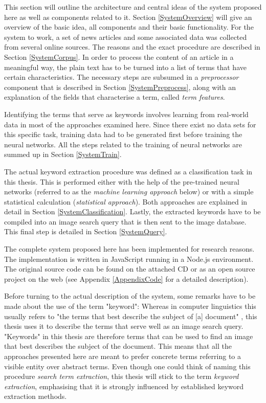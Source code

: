 \documentclass[11pt,a4paper,twoside]{article}
\begin{document}
This section will outline the architecture and central ideas of the system proposed here as well as components related to it. Section \ref{SystemOverview} will give an overview of the basic idea, all components and their basic functionality. For the system to work, a set of news articles and some associated data was collected from several online sources. The reasons and the exact procedure are described in Section \ref{SystemCorpus}. In order to process the content of an article in a meaningful way, the plain text has to be turned into a list of terms that have certain characteristics. The necessary steps are subsumed in a \emph{preprocessor} component that is described in Section \ref{SystemPreprocess}, along with an explanation of the fields that characterise a term, called \emph{term features}.

Identifying the terms that serve as keywords involves learning from real-world data in most of the approaches examined here. Since there exist no data sets for this specific task, training data had to be generated first before training the neural networks. All the steps related to the training of neural networks are summed up in Section \ref{SystemTrain}.

The actual keyword extraction procedure was defined as a classification task in this thesis. This is performed either with the help of the pre-trained neural networks (referred to as the \emph{machine learning approach} below) or with a simple statistical calculation (\emph{statistical approach}). Both approaches are explained in detail in Section \ref{SystemClassification}. Lastly, the extracted keywords have to be compiled into an image search query that is then sent to the image database. This final step is detailed in Section \ref{SystemQuery}.

The complete system proposed here has been implemented for research reasons. The implementation is written in JavaScript running in a Node.js environment. The original source code can be found on the attached CD or as an open source project on the web (see Appendix \ref{AppendixCode} for a detailed description).

Before turning to the actual description of the system, some remarks have to be made about the use of the term "keyword": Whereas in computer linguistics this usually refers to "the terms that best describe the subject of [a] document" \cite[p. 1]{BeligaKeywordApproaches}, this thesis uses it to describe the terms that serve well as an image search query. "Keywords" in this thesis are therefore terms that can be used to find an image that best describes the subject of the document. This means that all the approaches presented here are meant to prefer concrete terms referring to a visible entity over abstract terms. Even though one could think of naming this procedure \emph{search term extraction}, this thesis will stick to the term \emph{keyword extraction}, emphasising that it is strongly influenced by established keyword extraction methods.
\end{document}
